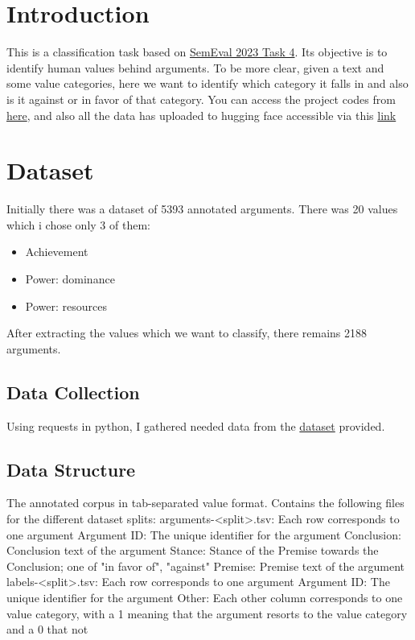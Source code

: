 
\section{Introduction}
This is a classification task based on \href{https://valueeval.webis.de/}{SemEval 2023 Task 4}. Its objective is to identify human values behind arguments.  
To be more clear, given a text and some value categories, here we want to identify which category it falls in and also is it against or in favor of that category.  
You can access the project codes from \href{https://github.com/ShahrzadAzari/Human_Value_Detection}{here},
and also all the data has uploaded to hugging face accessible via this \href{https://huggingface.co/datasets/Sheza/Human-Values}{link}

\section{Dataset}
Initially there was a dataset of 5393 annotated arguments. There was 20 values which i chose only 3 of them:
\begin{itemize}
	\item Achievement
	\item Power: dominance
	\item Power: resources
\end{itemize}
After extracting the values which we want to classify, there remains 2188 arguments.

\subsection{Data Collection}
Using requests in python, I gathered needed data from the \href{https://zenodo.org/record/7879430/files}{dataset} provided.

\subsection{Data Structure}
The annotated corpus in tab-separated value format. Contains the following files for the different dataset splits:
    arguments-<split>.tsv: Each row corresponds to one argument
        Argument ID: The unique identifier for the argument
        Conclusion: Conclusion text of the argument
        Stance: Stance of the Premise towards the Conclusion; one of "in favor of", "against"
        Premise: Premise text of the argument
    labels-<split>.tsv: Each row corresponds to one argument
        Argument ID: The unique identifier for the argument
        Other: Each other column corresponds to one value category, with a 1 meaning that the argument resorts to the value category and a 0 that not

